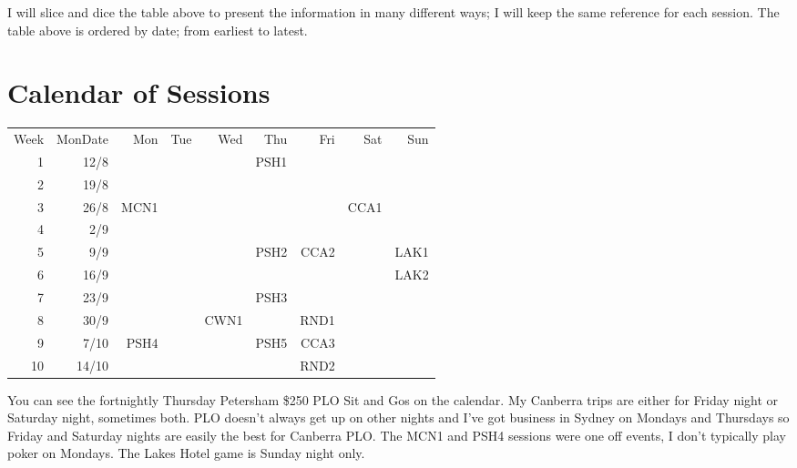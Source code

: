 I will slice and dice the table above to present the information in
many different ways; I will keep the same reference for each
session. The table above is ordered by date; from earliest to latest.

\section*{Calendar of Sessions}

\begin{tabular}{rrrrrrrrr}
  Week & MonDate & Mon & Tue & Wed & Thu & Fri & Sat & Sun \\
  1 & 12/8  &     &     &     & PSH1 &     &     &     \\
  2 & 19/8  &     &     &     &      &     &     &     \\
  3 & 26/8  & MCN1 &    &     &      &     & CCA1 &    \\
  4 & 2/9  &      &    &     &      &     &     &     \\
  5 &  9/9  &     &     &     & PSH2 & CCA2&     & LAK1\\
  6 & 16/9  &     &     &     &      &     &     & LAK2\\
  7 & 23/9  &     &     &     & PSH3 &     &     &     \\
  8 & 30/9  &     &     & CWN1&      & RND1&     &     \\
  9 & 7/10 & PSH4 &    &     & PSH5 & CCA3&     &     \\
 10 & 14/10 &     &     &     &      & RND2&     &     \\
\end{tabular}

You can see the fortnightly Thursday Petersham \$250 PLO Sit and Gos
on the calendar. My Canberra trips are either for Friday night or
Saturday night, sometimes both. PLO doesn't always get up on other
nights and I've got business in Sydney on Mondays and Thursdays so
Friday and Saturday nights are easily the best for Canberra PLO. The
MCN1 and PSH4 sessions were one off events, I don't typically play
poker on Mondays. The Lakes Hotel game is Sunday night only.
